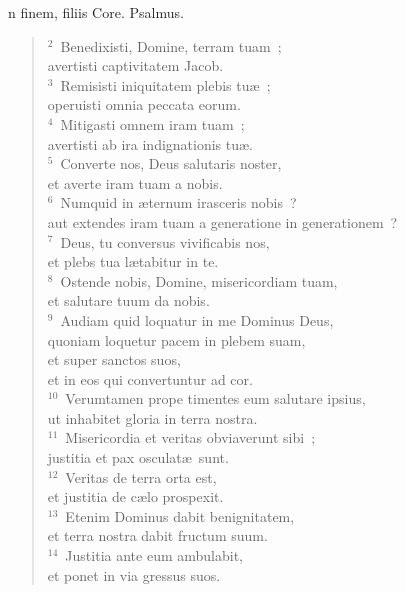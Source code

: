 \bchapter
{}n finem, filiis Core. Psalmus.
\begin{flushleft}\begin{verse}\vspace{6pt}${}^{2}$~Benedixisti, Domine, terram tuam~;\\ avertisti captivitatem Jacob.\\
${}^{3}$~Remisisti iniquitatem plebis tu\ae~;\\ operuisti omnia peccata eorum.\\
${}^{4}$~Mitigasti omnem iram tuam~;\\ avertisti ab ira indignationis tu\ae .\\
${}^{5}$~Converte nos, Deus salutaris noster,\\ et averte iram tuam a nobis.\\
${}^{6}$~Numquid in \ae ternum irasceris nobis~?\\ aut extendes iram tuam a generatione in generationem~?\\
${}^{7}$~Deus, tu conversus vivificabis nos,\\ et plebs tua l\ae tabitur in te.\\
${}^{8}$~Ostende nobis, Domine, misericordiam tuam,\\ et salutare tuum da nobis.\\
${}^{9}$~Audiam quid loquatur in me Dominus Deus,\\ quoniam loquetur pacem in plebem suam,\\ et super sanctos suos,\\ et in eos qui convertuntur ad cor.\\
${}^{10}$~Verumtamen prope timentes eum salutare ipsius,\\ ut inhabitet gloria in terra nostra.\\
${}^{11}$~Misericordia et veritas obviaverunt sibi~;\\ justitia et pax osculat\ae\ sunt.\\
${}^{12}$~Veritas de terra orta est,\\ et justitia de c\ae lo prospexit.\\
${}^{13}$~Etenim Dominus dabit benignitatem,\\ et terra nostra dabit fructum suum.\\
${}^{14}$~Justitia ante eum ambulabit,\\ et ponet in via gressus suos.\end{verse}\end{flushleft}




